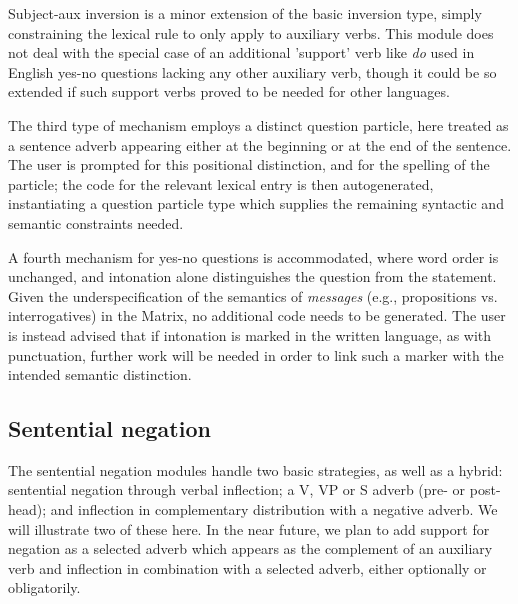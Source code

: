 \documentclass[11pt]{article}
\begin{document}
Subject-aux inversion is a minor extension of the basic inversion type,
simply constraining the lexical rule to only apply to auxiliary verbs.
This module does not deal with the special case of an additional 'support'
verb like {\it do} used in English yes-no questions lacking any other
auxiliary verb, though it could be so extended if such support verbs
proved to be needed for other languages.

The third type of mechanism employs a distinct question particle, here
treated as a sentence adverb appearing either at the beginning or at the
end of the sentence.  The user is prompted for this positional distinction,
and for the spelling of the particle; the code for the relevant lexical
entry is then autogenerated, instantiating a question particle type which
supplies the remaining syntactic and semantic constraints needed.

A fourth mechanism for yes-no questions is accommodated, where word order is
unchanged, and intonation alone distinguishes the question from the statement.
Given the underspecification of the semantics of {\it messages} (e.g.,
propositions vs. interrogatives) in the Matrix, no additional code needs to
be generated.  The user is instead advised that if intonation is marked in 
the written language, as with punctuation, further work will be needed in order
to link such a marker with the intended semantic distinction.

\subsection{Sentential negation}

The sentential negation modules handle two basic strategies, as well
as a hybrid: sentential negation through verbal inflection; a V,
VP or S adverb (pre- or post-head); and inflection in complementary
distribution with a negative adverb. We will illustrate two of these
here.  In the near future, we plan to add support for negation as a
selected adverb which appears as the complement of an auxiliary verb 
and inflection in combination with a selected adverb,
either optionally or obligatorily.
\end{document}
